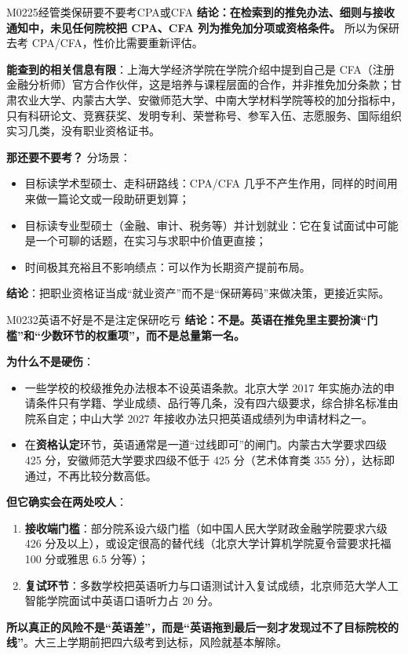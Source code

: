 \begin{qa}{M0225}{经管类保研要不要考CPA或CFA}
\textbf{结论：在检索到的推免办法、细则与接收通知中，未见任何院校把 CPA、CFA 列为推免加分项或资格条件。} 所以为保研去考 CPA/CFA，性价比需要重新评估。

\textbf{能查到的相关信息有限}：上海大学经济学院在学院介绍中提到自己是 CFA（注册金融分析师）官方合作伙伴，这是培养与课程层面的合作，并非推免加分条款；甘肃农业大学、内蒙古大学、安徽师范大学、中南大学材料学院等校的加分指标中，只有科研论文、竞赛获奖、发明专利、荣誉称号、参军入伍、志愿服务、国际组织实习几类，没有职业资格证书。

\textbf{那还要不要考？} 分场景：
\begin{itemize}
  \item 目标读学术型硕士、走科研路线：CPA/CFA 几乎不产生作用，同样的时间用来做一篇论文或一段助研更划算；
  \item 目标读专业型硕士（金融、审计、税务等）并计划就业：它在复试面试中可能是一个可聊的话题，在实习与求职中价值更直接；
  \item 时间极其充裕且不影响绩点：可以作为长期资产提前布局。
\end{itemize}

\textbf{结论}：把职业资格证当成“就业资产”而不是“保研筹码”来做决策，更接近实际。
\end{qa}

\begin{qa}{M0232}{英语不好是不是注定保研吃亏}
\textbf{结论：不是。英语在推免里主要扮演“门槛”和“少数环节的权重项”，而不是总量第一名。}

\textbf{为什么不是硬伤}：
\begin{itemize}
  \item 一些学校的校级推免办法根本不设英语条款。北京大学 2017 年实施办法的申请条件只有学籍、学业成绩、品行等几条，没有四六级要求，综合排名标准由院系自定；中山大学 2027 年接收办法只把英语成绩列为申请材料之一。
  \item 在\textbf{资格认定}环节，英语通常是一道“过线即可”的闸门。内蒙古大学要求四级 425 分，安徽师范大学要求四级不低于 425 分（艺术体育类 355 分），达标即通过，不再比较分数高低。
\end{itemize}

\textbf{但它确实会在两处咬人}：
\begin{enumerate}
  \item \textbf{接收端门槛}：部分院系设六级门槛（如中国人民大学财政金融学院要求六级 426 分及以上），或设定很高的替代线（北京大学计算机学院夏令营要求托福 100 分或雅思 6.5 分等）；
  \item \textbf{复试环节}：多数学校把英语听力与口语测试计入复试成绩，北京师范大学人工智能学院面试中英语口语听力占 20 分。
\end{enumerate}

\textbf{所以真正的风险不是“英语差”，而是“英语拖到最后一刻才发现过不了目标院校的线”}。大三上学期前把四六级考到达标，风险就基本解除。
\end{qa}

